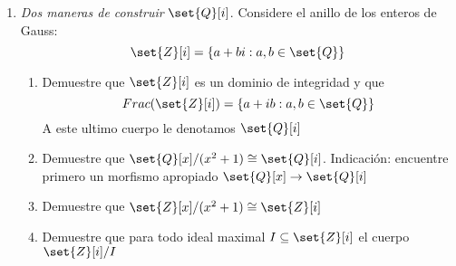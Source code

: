 \documentclass[11pt]{article}
\begin{document}
\begin{enumerate}
\begin{proof}
\begin{enumerate}[label=(\alph*)]
                \item Tomamos un $k$ tal que $(k)=I$:
                \[\therefore k=p^r\cdot\frac{a}{b}\]
                Luego por ser un ideal si tomamos un $x\in O_p\implies xk\in I$
                \[xk=p^{r+r'}\cdot\frac{aa'}{bb'}\]
                Sabemos que $r'\geq 0\implies r+r'\geq r$, lo que nos deja que ver que $\forall a\in I: v_p(a)\geq r$, ya que $x$ era un elemento cualquiera. Pero esto nos dice que $I\subseteq\{x\in\set{Q}:v_p(x)\geq r\}$, por lo que nos falta la otra contención. Para ello notamos que 

                \item Usaremos un morfismo similar al de 2. (b) y el primer teorema de isomorfismo.
                \[\varphi(p^k)=0,\varphi(p^r)\neq 0\quad 0\leq r<k\]
                \[\varphi\left(\frac{1}{a}\right)=\bar{b}^{-1}\]
                Este ultimo existe ya que $\gcd(p^k,b)=1$, por lo que $\bar{b}$ tiene inverso en $\set{Z}/p^k\set{Z}$. Dado esto notamos trivialmente que $\ker\varphi=m_p^k$, por lo que podemos concluir que $O_p/m^k_p\cong \set{Z}/p^k\set{Z}$
            \end{enumerate}
        \end{proof}

        \item \textit{Dos maneras de construir} $\set{Q}[i]$. Considere el anillo de los enteros de Gauss:
        \[\set{Z}[i]=\{a+bi:a,b\in\set{Q}\}\]
        \begin{enumerate}[label=(\alph*)]
            \item Demuestre que $\set{Z}[i]$ es un dominio de integridad y que
            \[Frac(\set{Z}[i])=\{a+ib:a,b\in\set{Q}\}\]
            A este ultimo cuerpo le denotamos $\set{Q}[i]$

            \item Demuestre que $\set{Q}[x]/(x^2+1)\cong\set{Q}[i]$. Indicación: encuentre primero un morfismo apropiado $\set{Q}[x]\rightarrow\set{Q}[i]$

            \item Demuestre que $\set{Z}[x]/(x^2+1)\cong\set{Z}[i]$

            \item Demuestre que para todo ideal maximal $I\subseteq\set{Z}[i]$ el cuerpo $\set{Z}[i]/I$
        \end{enumerate}


\end{enumerate}
\end{document}
